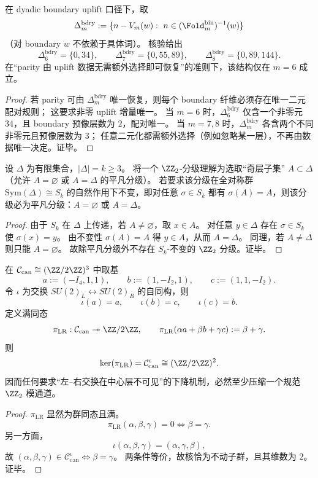 \begin{proposition}[sheet parity 在 \(m=6\) 的严格锚点性]\label{prop:xi-window6-sheet-parity-anchor-m6}
在 dyadic boundary uplift 口径下，取
\[
\Delta_m^{\mathrm{bdry}}
:=\{n-V_m(w):\ n\in(\Fold_m^{\mathrm{bin}})^{-1}(w)\}
\]
（对 boundary \(w\) 不依赖于具体词）。
核验给出
\[
\Delta_6^{\mathrm{bdry}}=\{0,34\},\qquad
\Delta_7^{\mathrm{bdry}}=\{0,55,89\},\qquad
\Delta_8^{\mathrm{bdry}}=\{0,89,144\}.
\]
在“parity 由 uplift 数据无需额外选择即可恢复”的准则下，该结构仅在 \(m=6\) 成立。
\end{proposition}
\begin{proof}
若 parity 可由 \(\Delta_m^{\mathrm{bdry}}\) 唯一恢复，则每个 boundary 纤维必须存在唯一二元配对规则；
这要求非零 uplift 增量唯一。
当 \(m=6\) 时，\(\Delta_6^{\mathrm{bdry}}\) 仅含一个非零元 \(34\)，且 boundary 预像层数为 \(2\)，配对唯一。
当 \(m=7,8\) 时，\(\Delta_m^{\mathrm{bdry}}\) 各含两个不同非零元且预像层数为 \(3\)；
任意二元化都需额外选择（例如忽略某一层），不再由数据唯一决定。证毕。
\end{proof}

\begin{theorem}\label{thm:xi-sym-invariant-z2-grading-trivial}
设 \(\Delta\) 为有限集合，\(|\Delta|=k\ge 3\)。
将一个 \(\ZZ_2\)-分级理解为选取“奇层子集” \(A\subset\Delta\)（允许 \(A=\varnothing\) 或 \(A=\Delta\) 的平凡分级）。
若要求该分级在全对称群 \(\mathrm{Sym}(\Delta)\cong S_k\) 的自然作用下不变，即对任意 \(\sigma\in S_k\) 都有 \(\sigma(A)=A\)，则该分级必为平凡分级：\(A=\varnothing\) 或 \(A=\Delta\)。
\end{theorem}
\begin{proof}
由于 \(S_k\) 在 \(\Delta\) 上传递，若 \(A\neq\varnothing\)，取 \(x\in A\)。
对任意 \(y\in\Delta\) 存在 \(\sigma\in S_k\) 使 \(\sigma(x)=y\)。
由不变性 \(\sigma(A)=A\) 得 \(y\in A\)，从而 \(A=\Delta\)。
同理，若 \(A\neq\Delta\) 则只能 \(A=\varnothing\)。
故除平凡分级外不存在 \(S_k\)-不变的 \(\ZZ_2\) 分级。证毕。
\end{proof}

\begin{theorem}[左--右交换下的规范中心模与不可下降通道]\label{thm:xi-window6-lr-swap-canonical-center-mod}
在 \(\mathcal C_{\mathrm{can}}\cong(\ZZ/2\ZZ)^3\) 中取基
\[
a:=(-I_4,1,1),\qquad b:=(1,-I_2,1),\qquad c:=(1,1,-I_2).
\]
令 \(\iota\) 为交换 \(SU(2)_L\leftrightarrow SU(2)_R\) 的自同构，则
\[
\iota(a)=a,\qquad \iota(b)=c,\qquad \iota(c)=b.
\]
定义满同态
\[
\pi_{\mathrm{LR}}:\mathcal C_{\mathrm{can}}\twoheadrightarrow \ZZ/2\ZZ,\qquad
\pi_{\mathrm{LR}}(\alpha a+\beta b+\gamma c):=\beta+\gamma.
\]
则
\[
\ker(\pi_{\mathrm{LR}})=\mathcal C_{\mathrm{can}}^{\iota}
\cong (\ZZ/2\ZZ)^2.
\]
因而任何要求“左--右交换在中心层不可见”的下降机制，必然至少压缩一个规范 \(\ZZ_2\) 模通道。
\end{theorem}
\begin{proof}
\(\pi_{\mathrm{LR}}\) 显然为群同态且满。
\[
\pi_{\mathrm{LR}}(\alpha,\beta,\gamma)=0
\iff \beta=\gamma.
\]
另一方面，
\[
\iota(\alpha,\beta,\gamma)=(\alpha,\gamma,\beta),
\]
故
\(
(\alpha,\beta,\gamma)\in\mathcal C_{\mathrm{can}}^{\iota}
\iff \beta=\gamma
\)。
两条件等价，故核恰为不动子群，且其维数为 \(2\)。证毕。
\end{proof}

